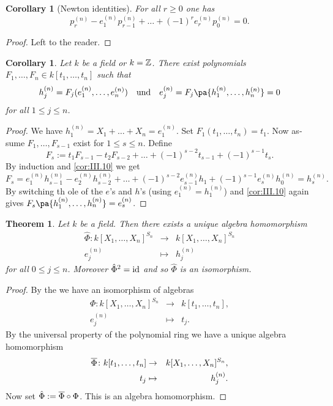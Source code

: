 \documentclass[12pt,a4paper]{scrartcl}
\theoremstyle{cplain}
\newtheorem{cor}[thmcounter]{Corollary}
\theoremstyle{cplain}
\newtheorem{thm}[thmcounter]{Theorem}
\theoremstyle{cplain}
\theoremstyle{definition}
\begin{document}
\begin{otherlanguage}{english}

\begin{cor}[Newton identities]
  For all $r \ge 0$ one has \[ p_r^{(n)} - e_1^{(n)}p_{r-1}^{(n)} + \ldots + (-1)^re_r^{(n)}p_0^{(n)} = 0. \]
\end{cor}
\begin{proof}
  Left to the reader.
\end{proof}

\begin{cor} \label{cor:III.12}
  Let $k$ be a field or $k= \mathbb Z$. There exist polynomials $F_1,\ldots,F_n \in k[t_1,\ldots,t_n]$ such that \[ h_j^{(n)} = F_j(e_1^{(n)},\ldots,e_n^{(n)}) \quad\text{und}\quad e_j^{(n)}=F_j\pa{h_1^{(n)},\ldots,h_n^{(n)}} =0 \] for all $1 \le j \le n$.
\end{cor}
\begin{proof}
  We have $h_1^{(n)} = X_1 + \ldots+X_n = e_1^{(n)}$. Set $F_1(t_1,\ldots,t_n) = t_1$. Now assume $F_1,\ldots,F_{s-1}$ exist for $1\le s \le n$. Define \[ F_s := t_1F_{s-1}-t_2F_{s-2} + \ldots + (-1)^{s-2}t_{s-1} +(-1)^{s-1}t_s. \] By induction and \cref{cor:III.10} we get \[ F_s = e_1^{(n)}h_{s-1}^{(n)} - e_2^{(n)}h_{s-2}^{(n)} + \ldots +(-1)^{s-2}e_{s-1}^{(n)}h_1+(-1)^{s-1}e_s^{(n)}h_0^{(n)} = h_s^{(n)}. \]
  By switching th ole of the $e$'s and $h$'s (using $e_1^{(n)} = h_1^{(n)}$) and \cref{cor:III.10} again gives $F_s\pa{h_1^{(n)},\ldots,h_n^{(n)}} = e_s^{(n)}$.
\end{proof}

\begin{thm} \label{thm:III.13}
  Let $k$ be a field. Then there exists a unique algebra homomorphism 
  \begin{eqnarray*}
    \hat\Phi\colon k[X_1,\ldots,X_n]^{S_n} &\to& k[X_1,\ldots,X_n]^{S_n} \\
    e_j^{(n)} &\mapsto& h_j^{(n)}
  \end{eqnarray*}
  for all $0 \le j \le n$. Moreover ${\hat\Phi}^2 = \operatorname{id}$ and so $\hat\Phi$ is an isomorphism.
\end{thm}
\begin{proof}
  By the  we have an isomorphism of algebras
  \begin{eqnarray*}
    \Phi\colon k[X_1,\ldots,X_n]^{S_n} &\to& k[t_1,\ldots,t_n], \\
    e_j^{(n)} &\mapsto& t_j.
  \end{eqnarray*}
  By the universal property of the polynomial ring we have a unique algebra homomorphism
  \begin{eqnarray*}
    \overline\Phi\colon k[t_1,\ldots,t_n] &\to& k[X_1,\ldots,X_n]^{S_n}, \\
    t_j &\mapsto& h_j^{(n)}.
  \end{eqnarray*}
  Now set $\hat\Phi := \overline\Phi \circ \Phi$. This is an algebra homomorphism.
  

\end{proof}
\end{otherlanguage}
\end{document}
